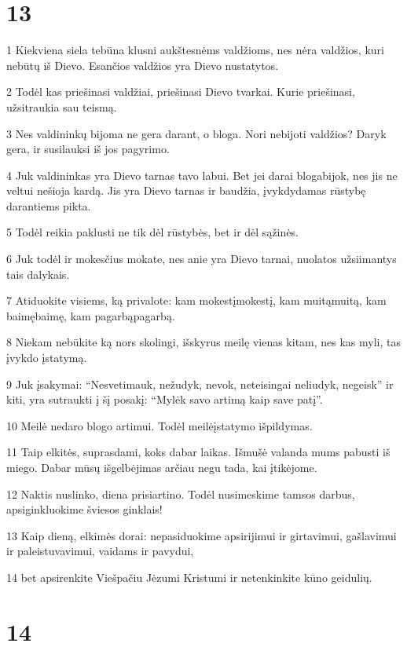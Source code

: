 \chapter{13}


\par 1 Kiekviena siela tebūna klusni aukštesnėms valdžioms, nes nėra valdžios, kuri nebūtų iš Dievo. Esančios valdžios yra Dievo nustatytos. 
\par 2 Todėl kas priešinasi valdžiai, priešinasi Dievo tvarkai. Kurie priešinasi, užsitraukia sau teismą. 
\par 3 Nes valdininkų bijoma ne gera darant, o bloga. Nori nebijoti valdžios? Daryk gera, ir susilauksi iš jos pagyrimo. 
\par 4 Juk valdininkas yra Dievo tarnas tavo labui. Bet jei darai bloga­bijok, nes jis ne veltui nešioja kardą. Jis yra Dievo tarnas ir baudžia, įvykdydamas rūstybę darantiems pikta. 
\par 5 Todėl reikia paklusti ne tik dėl rūstybės, bet ir dėl sąžinės. 
\par 6 Juk todėl ir mokesčius mokate, nes anie yra Dievo tarnai, nuolatos užsiimantys tais dalykais. 
\par 7 Atiduokite visiems, ką privalote: kam mokestį­mokestį, kam muitą­muitą, kam baimę­baimę, kam pagarbą­pagarbą. 
\par 8 Niekam nebūkite ką nors skolingi, išskyrus meilę vienas kitam, nes kas myli, tas įvykdo įstatymą. 
\par 9 Juk įsakymai: “Nesvetimauk, nežudyk, nevok, neteisingai neliudyk, negeisk” ir kiti, yra sutraukti į šį posakį: “Mylėk savo artimą kaip save patį”. 
\par 10 Meilė nedaro blogo artimui. Todėl meilė­įstatymo išpildymas. 
\par 11 Taip elkitės, suprasdami, koks dabar laikas. Išmušė valanda mums pabusti iš miego. Dabar mūsų išgelbėjimas arčiau negu tada, kai įtikėjome. 
\par 12 Naktis nuslinko, diena prisiartino. Todėl nusimeskime tamsos darbus, apsiginkluokime šviesos ginklais! 
\par 13 Kaip dieną, elkimės dorai: nepasiduokime apsirijimui ir girtavimui, gašlavimui ir paleistuvavimui, vaidams ir pavydui, 
\par 14 bet apsirenkite Viešpačiu Jėzumi Kristumi ir netenkinkite kūno geidulių.


\chapter{14}


